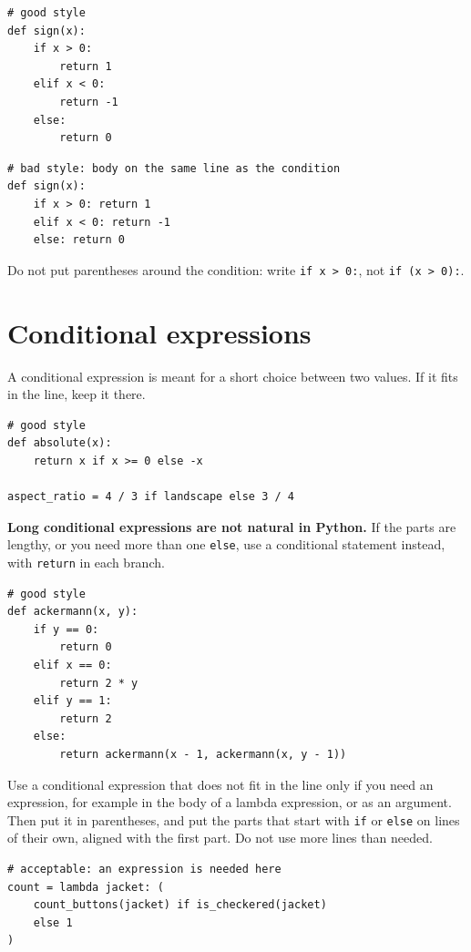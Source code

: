 \begin{lstlisting}
# good style
def sign(x):
    if x > 0:
        return 1
    elif x < 0:
        return -1
    else:
        return 0
\end{lstlisting}

\begin{lstlisting}
# bad style: body on the same line as the condition
def sign(x):
    if x > 0: return 1
    elif x < 0: return -1
    else: return 0
\end{lstlisting}

Do not put parentheses around the condition: write \lstinline{if x > 0:}, not
\lstinline{if (x > 0):}.

\section*{Conditional expressions}

A conditional expression is meant for a short choice between two values. If it fits in the line,
keep it there.

\begin{lstlisting}
# good style
def absolute(x):
    return x if x >= 0 else -x

aspect_ratio = 4 / 3 if landscape else 3 / 4
\end{lstlisting}

\textbf{Long conditional expressions are not natural in Python.} If the parts are lengthy, or you
need more than one \lstinline{else}, use a conditional statement instead, with
\lstinline{return} in each branch.

\begin{lstlisting}
# good style
def ackermann(x, y):
    if y == 0:
        return 0
    elif x == 0:
        return 2 * y
    elif y == 1:
        return 2
    else:
        return ackermann(x - 1, ackermann(x, y - 1))
\end{lstlisting}

Use a conditional expression that does not fit in the line only if you need an expression, for
example in the body of a lambda expression, or as an argument. Then put it in parentheses, and put
the parts that start with \lstinline{if} or \lstinline{else} on lines of their own, aligned with the
first part. Do not use more lines than needed.

\begin{lstlisting}
# acceptable: an expression is needed here
count = lambda jacket: (
    count_buttons(jacket) if is_checkered(jacket)
    else 1
)
\end{lstlisting}

